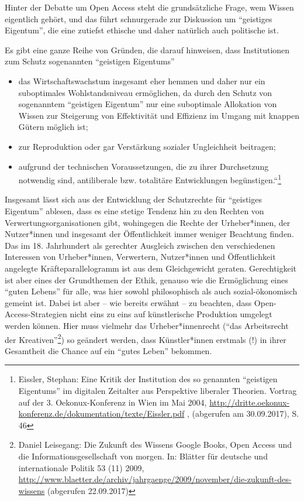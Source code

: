 \documentclass[a4paper,
fontsize=11pt,
oneside,
numbers=noperiodatend,
parskip=half-,
bibliography=totoc,
final
]{scrartcl}
\begin{document}
Hinter der Debatte um Open Access steht die grundsätzliche Frage, wem
Wissen eigentlich gehört, und das führt schnurgerade zur Diskussion um
\enquote{geistiges Eigentum}, die eine zutiefst ethische und daher
natürlich auch politische ist.

Es gibt eine ganze Reihe von Gründen, die darauf hinweisen, dass
Institutionen zum Schutz sogenannten \enquote{geistigen Eigentums}

\begin{itemize}
\item
  das Wirtschaftswachstum insgesamt eher hemmen und daher nur ein
  suboptimales Wohlstandsniveau ermöglichen, da durch den Schutz von
  sogenanntem \enquote{geistigen Eigentum} nur eine suboptimale
  Allokation von Wissen zur Steigerung von Effektivität und Effizienz im
  Umgang mit knappen Gütern möglich ist;
\item
  zur Reproduktion oder gar Verstärkung sozialer Ungleichheit beitragen;
\item
  aufgrund der technischen Voraussetzungen, die zu ihrer Durchsetzung
  notwendig sind, antiliberale bzw. totalitäre Entwicklungen
  begünstigen.``\footnote{Eissler, Stephan: Eine Kritik der Institution
    des so genannten \enquote{geistigen Eigentums} im digitalen
    Zeitalter aus Perspektive liberaler Theorien. Vortrag auf der 3.
    Oekonux-Konferenz in Wien im Mai 2004,
    \url{http://dritte.oekonux-konferenz.de/dokumentation/texte/Eissler.pdf}
    , (abgerufen am 30.09.2017), S. 46}
\end{itemize}

Insgesamt lässt sich aus der Entwicklung der Schutzrechte für
\enquote{geistiges Eigentum} ablesen, dass es eine stetige Tendenz hin
zu den Rechten von Verwertungsorganisationen gibt, wohingegen die Rechte
der Urheber*innen, der Nutzer*innen und insgesamt der Öffentlichkeit
immer weniger Beachtung finden. Das im 18. Jahrhundert als gerechter
Ausgleich zwischen den verschiedenen Interessen von Urheber*innen,
Verwertern, Nutzer*innen und Öffentlichkeit angelegte
Kräfteparallelogramm ist aus dem Gleichgewicht geraten. Gerechtigkeit
ist aber eines der Grundthemen der Ethik, genauso wie die Ermöglichung
eines \enquote{guten Lebens} für alle, was hier sowohl philosophisch als
auch sozial-ökonomisch gemeint ist. Dabei ist aber -- wie bereits
erwähnt -- zu beachten, dass Open-Access-Strategien nicht eins zu eins
auf künstlerische Produktion umgelegt werden können. Hier muss vielmehr
das Urheber*innenrecht (\enquote{das Arbeitsrecht der
Kreativen}\footnote{Daniel Leisegang: Die Zukunft des Wissens Google
  Books, Open Access und die Informationsgesellschaft von morgen. In:
  Blätter für deutsche und internationale Politik 53 (11) 2009,
  \url{http://www.blaetter.de/archiv/jahrgaenge/2009/november/die-zukunft-des-wissens}
  (abgerufen 22.09.2017)}) so geändert werden, dass Künstler*innen
erstmals (!) in ihrer Gesamtheit die Chance auf ein \enquote{gutes
Leben} bekommen.
\end{document}
